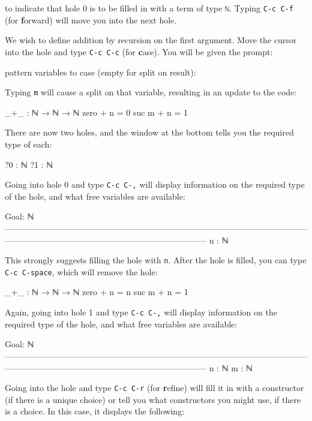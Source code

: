 to indicate that hole 0 is to be filled in with a term of type
\texttt{ℕ}. Typing \texttt{C-c\ C-f} (for \textbf{f}orward) will move
you into the next hole.

We wish to define addition by recursion on the first argument. Move the
cursor into the hole and type \texttt{C-c\ C-c} (for \textbf{c}ase). You
will be given the prompt:

\begin{myDisplay}
pattern variables to case (empty for split on result):
\end{myDisplay}

Typing \texttt{m} will cause a split on that variable, resulting in an
update to the code:

\begin{myDisplay}
_+_ : ℕ → ℕ → ℕ
zero + n = { }0
suc m + n = { }1
\end{myDisplay}

There are now two holes, and the window at the bottom tells you the
required type of each:

\begin{myDisplay}
?0 : ℕ
?1 : ℕ
\end{myDisplay}

Going into hole 0 and type \texttt{C-c\ C-,} will display information on
the required type of the hole, and what free variables are available:

\begin{myDisplay}
Goal: ℕ
————————————————————————————————————————————————————————————
n : ℕ
\end{myDisplay}

This strongly suggests filling the hole with \texttt{n}. After the hole
is filled, you can type \texttt{C-c\ C-space}, which will remove the
hole:

\begin{myDisplay}
_+_ : ℕ → ℕ → ℕ
zero + n = n
suc m + n = { }1
\end{myDisplay}

Again, going into hole 1 and type \texttt{C-c\ C-,} will display
information on the required type of the hole, and what free variables
are available:

\begin{myDisplay}
Goal: ℕ
————————————————————————————————————————————————————————————
n : ℕ
m : ℕ
\end{myDisplay}

Going into the hole and type \texttt{C-c\ C-r} (for \textbf{r}efine)
will fill it in with a constructor (if there is a unique choice) or tell
you what constructors you might use, if there is a choice. In this case,
it displays the following:

